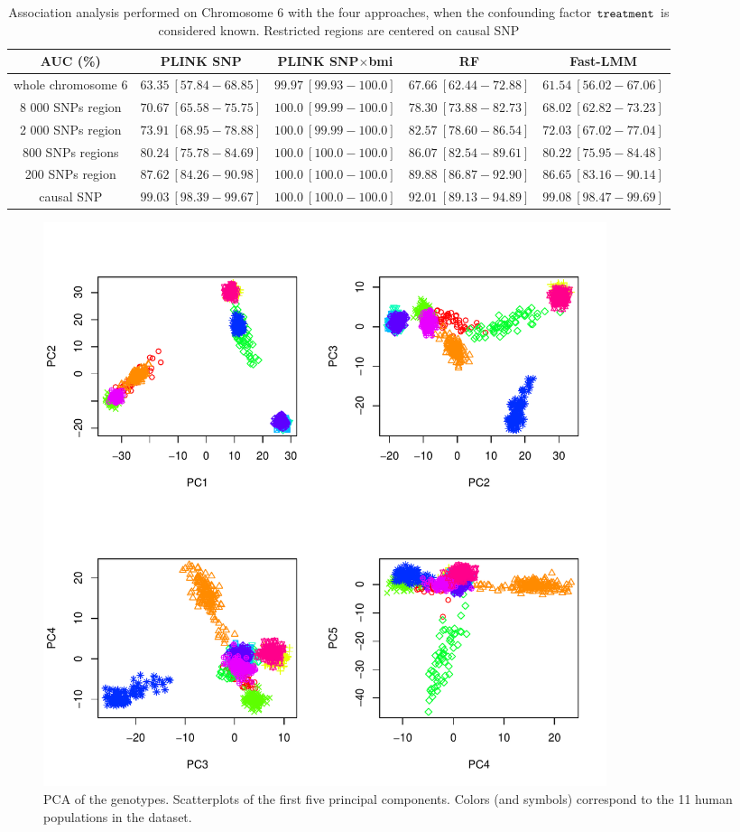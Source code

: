 \documentclass[10pt,a4paper]{article}
\begin{document}
\newpage
\begin{table}
\begin{center}
\small
\begin{tabular}{ccccc}
\hline
AUC (\%) & PLINK SNP & PLINK SNP$\times$bmi & RF & Fast-LMM \\
\hline
whole chromosome 6 &$63.35\ [57.84 -68.85 ] $ & $99.97\ [99.93 - 100.0] $ & $67.66\ [62.44 - 72.88 ]$ & $61.54\ [56.02-67.06]$  \\
8 000 SNPs region &$70.67\ [65.58 -75.75 ] $ & $100.0\ [99.99-100.0] $ & $78.30\ [73.88- 82.73]$  &$68.02\ [62.82-73.23]$ \\
2 000 SNPs region & $73.91\ [68.95 -78.88 ] $&$100.0\ [99.99-100.0] $ &  $82.57\ [78.60 - 86.54 ]$ &$72.03\ [67.02-77.04]$ \\
800 SNPs regions &$80.24\ [75.78 -84.69 ] $ & $100.0\ [100.0-100.0]$  & $86.07\ [82.54-89.61]$ &$80.22\ [75.95-84.48]$ \\
200 SNPs region &$87.62\ [84.26 -90.98 ] $ & $100.0\ [100.0-100.0]$ &  $89.88\ [86.87-92.90]$ &$86.65\ [83.16-90.14]$ \\
causal SNP & $99.03\ [98.39 -99.67 ] $ &$100.0\ [100.0-100.0]$  & $92.01\ [89.13-94.89]$ &$99.08\ [98.47-99.69]$ \\
\hline
\end{tabular}
\end{center}
\caption{\label{tab-auc-treatment} Association analysis performed on Chromosome 6 with the four approaches, when the confounding factor $\tt{treatment}$ is considered known. Restricted regions are centered on causal SNP}
\end{table}

\newpage

\begin{figure}
\begin{center}
\includegraphics[width=0.8\textwidth]{pca} 
\end{center}
\caption{PCA of the genotypes. Scatterplots of the first five principal components. Colors (and symbols) correspond to the 11 human populations in the dataset.}\label{fig-pca}
\end{figure}
\end{document}
